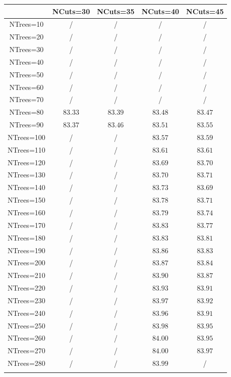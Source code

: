 \centering
\begin{tabular}{ccccc} \toprule\toprule
 & NCuts=30 & NCuts=35 & NCuts=40 & NCuts=45\\\midrule
NTrees=10 &  / &  / &  / &  /\\
NTrees=20 &  / &  / &  / &  /\\
NTrees=30 &  / &  / &  / &  /\\
NTrees=40 &  / &  / &  / &  /\\
NTrees=50 &  / &  / &  / &  /\\
NTrees=60 &  / &  / &  / &  /\\
NTrees=70 &  / &  / &  / &  /\\
NTrees=80 & $83.33$ & $83.39$ & $83.48$ & $83.47$\\
NTrees=90 & $83.37$ & $83.46$ & $83.51$ & $83.55$\\
NTrees=100 &  / &  / & $83.57$ & $83.59$\\
NTrees=110 &  / &  / & $83.61$ & $83.61$\\
NTrees=120 &  / &  / & $83.69$ & $83.70$\\
NTrees=130 &  / &  / & $83.70$ & $83.71$\\
NTrees=140 &  / &  / & $83.73$ & $83.69$\\
NTrees=150 &  / &  / & $83.78$ & $83.71$\\
NTrees=160 &  / &  / & $83.79$ & $83.74$\\
NTrees=170 &  / &  / & $83.83$ & $83.77$\\
NTrees=180 &  / &  / & $83.83$ & $83.81$\\
NTrees=190 &  / &  / & $83.86$ & $83.83$\\
NTrees=200 &  / &  / & $83.87$ & $83.84$\\
NTrees=210 &  / &  / & $83.90$ & $83.87$\\
NTrees=220 &  / &  / & $83.93$ & $83.91$\\
NTrees=230 &  / &  / & $83.97$ & $83.92$\\
NTrees=240 &  / &  / & $83.96$ & $83.91$\\
NTrees=250 &  / &  / & $83.98$ & $83.95$\\
NTrees=260 &  / &  / & $84.00$ & $83.95$\\
NTrees=270 &  / &  / & $84.00$ & $83.97$\\
NTrees=280 &  / &  / & $83.99$ &  /\\
\bottomrule\bottomrule\\
\end{tabular}
